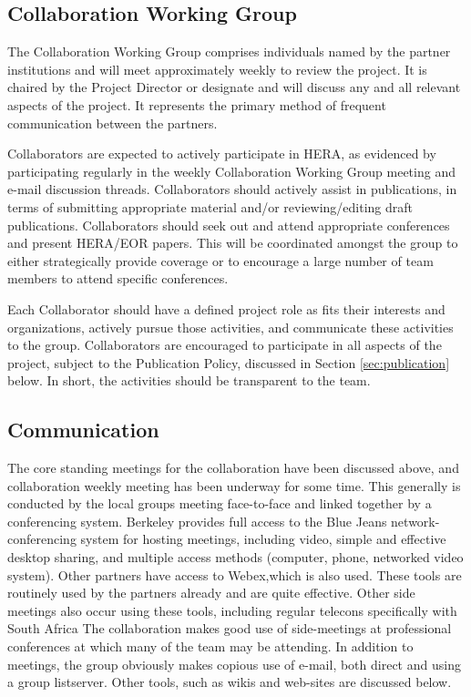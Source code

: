 \documentclass[preprint]{aastex}
\begin{document}
\subsection{Collaboration Working Group}
The Collaboration Working Group comprises individuals named by the partner
institutions and will meet approximately weekly to review the project. It is chaired
by the Project Director or designate and will discuss any and all relevant aspects of
the project. It represents the primary method of frequent communication between the
partners.

Collaborators are expected to actively participate in HERA, as evidenced by participating
regularly in the weekly Collaboration Working Group meeting and e-mail discussion
threads.  Collaborators should actively assist in publications, in terms of submitting
appropriate material and/or reviewing/editing draft publications.  Collaborators should
seek out and attend appropriate conferences and present HERA/EOR papers.  This will
be coordinated amongst the group to either strategically provide coverage or to encourage 
a large number of team members to attend specific conferences.

Each Collaborator should have a defined project role as fits their interests and organizations,
actively pursue those activities, and communicate these activities to the group.  Collaborators
are encouraged to participate in all aspects of the project, subject to the Publication Policy, 
discussed in Section \ref{sec:publication} below.  In short, the activities should be transparent
to the team.

\subsection{Communication}
The core standing meetings for the collaboration have been discussed above, and
collaboration weekly meeting has been underway for some time. This generally is
conducted by the local groups meeting face-to-face and linked together by a
conferencing system. Berkeley provides full access to the Blue Jeans
network-conferencing system for hosting meetings, including video, simple and
effective desktop sharing, and multiple access methods (computer, phone, networked
video system). Other partners have access to Webex,which is also used. These tools
are routinely used by the partners already and are quite effective.
Other side meetings also occur using these tools, including regular telecons
specifically with South Africa The collaboration makes good use of side-meetings at
professional conferences at which many of the team may be attending.
In addition to meetings, the group obviously makes copious use of e-mail, both direct 
and using a group listserver.  Other tools, such as wikis and web-sites are discussed below.
\end{document}
